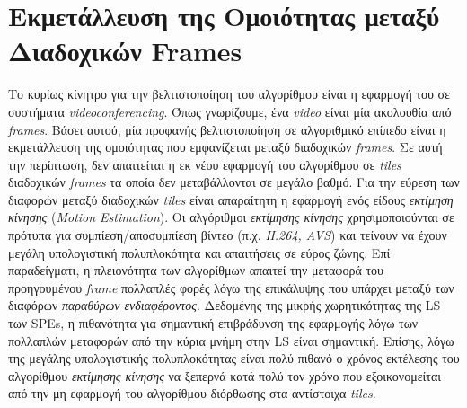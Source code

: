 \section{Εκμετάλλευση της Ομοιότητας μεταξύ Διαδοχικών Frames}
\label{section:sect55}
\indent
Το κυρίως κίνητρο για την βελτιστοποίηση του αλγορίθμου είναι η εφαρμογή του σε συστήματα \textsl{videoconferencing}. Όπως γνωρίζουμε, ένα \textsl{video} είναι μία ακολουθία από \textsl{frames}. Βάσει αυτού, μία προφανής βελτιστοποίηση σε αλγοριθμικό επίπεδο είναι η εκμετάλλευση της ομοιότητας που εμφανίζεται μεταξύ διαδοχικών \textsl{frames}. Σε αυτή την περίπτωση, δεν απαιτείται η εκ νέου εφαρμογή του αλγορίθμου σε \textsl{tiles} διαδοχικών \textsl{frames} τα οποία δεν μεταβάλλονται σε μεγάλο βαθμό.\newline \indent
Για την εύρεση των διαφορών μεταξύ διαδοχικών \textsl{tiles} είναι απαραίτητη η εφαρμογή ενός είδους \textsl{εκτίμηση κίνησης} (\textsl{Motion Estimation}). Οι αλγόριθμοι \textsl{εκτίμησης κίνησης} χρησιμοποιούνται σε πρότυπα για συμπίεση/αποσυμπίεση βίντεο (π.χ. \textsl{H.264, AVS}) και τείνουν να έχουν μεγάλη υπολογιστική πολυπλοκότητα και απαιτήσεις σε εύρος ζώνης. Επί παραδείγματι, η πλειονότητα των αλγορίθμων απαιτεί την μεταφορά του προηγουμένου \textsl{frame} πολλαπλές φορές λόγω της επικάλυψης που υπάρχει μεταξύ των διαφόρων \textsl{παραθύρων ενδιαφέροντος}. Δεδομένης της μικρής χωρητικότητας της \ac{LS} των \acp{SPE}, η πιθανότητα για σημαντική επιβράδυνση της εφαρμογής λόγω των πολλαπλών μεταφορών από την κύρια μνήμη στην \ac{LS} είναι σημαντική. Επίσης, λόγω της μεγάλης υπολογιστικής πολυπλοκότητας είναι πολύ πιθανό ο χρόνος εκτέλεσης του αλγορίθμου \textsl{εκτίμησης κίνησης} να ξεπερνά κατά πολύ τον χρόνο που εξοικονομείται από την μη εφαρμογή του αλγορίθμου διόρθωσης στα αντίστοιχα \textsl{tiles}.

